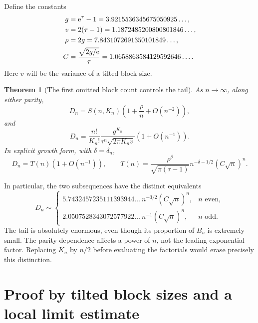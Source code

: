 \documentclass[11pt,a4paper]{article}
\numberwithin{equation}{section}
\newtheorem{theorem}{Theorem}[section]
\theoremstyle{remark}
\newcommand{\e}{\mathrm e}
\begin{document}
Define the constants
\begin{align}
 g&=\e^\tau-1=3.9215536345675050925\ldots,\notag\\
 v&=2(\tau-1)=1.1872485200800801846\ldots,\notag\\
 \rho&=2g=7.8431072691350101849\ldots,\label{eq:constants}\\
 C&=\frac{\sqrt{2g/\e}}{\tau}
   =1.0658863584129592646\ldots.\notag
\end{align}
Here $v$ will be the variance of a tilted block size.

\begin{theorem}[The first omitted block count controls the tail]
\label{thm:tail}
As $n\to\infty$, along either parity,
\begin{equation}\label{eq:endpoint}
 D_n=S(n,K_n)\left(1+\frac{\rho}{n}+O(n^{-2})\right),
\end{equation}
and
\begin{equation}\label{eq:tailfactorial}
 D_n=\frac{n!}{K_n!}\frac{g^{K_n}}{\tau^n\sqrt{2\pi K_n v}}
       \left(1+O(n^{-1})\right).
\end{equation}
In explicit growth form, with $\delta=\delta_n$,
\begin{equation}\label{eq:tailT}
 \boxed{\displaystyle
 D_n=T(n)\left(1+O(n^{-1})\right),\qquad
 T(n)=\frac{\rho^\delta}{\sqrt{\pi(\tau-1)}}
          n^{-\delta-1/2}(C\sqrt n)^n.}
\end{equation}
\end{theorem}

In particular, the two subsequences have the distinct equivalents
\begin{equation}\label{eq:parity}
 D_n\sim
 \begin{cases}
  5.7432457235111393944\ldots\ n^{-3/2}(C\sqrt n)^n,
       &n\text{ even},\\[3pt]
  2.0507528343072577922\ldots\ n^{-1}(C\sqrt n)^n,
       &n\text{ odd}.
 \end{cases}
\end{equation}
The tail is absolutely enormous, even though its proportion of $B_n$ is
extremely small. The parity dependence affects a power of $n$, not the
leading exponential factor. Replacing $K_n$ by $n/2$ before evaluating the
factorials would erase precisely this distinction.

\section{Proof by tilted block sizes and a local limit estimate}
\label{sec:tailproof}
\end{document}
